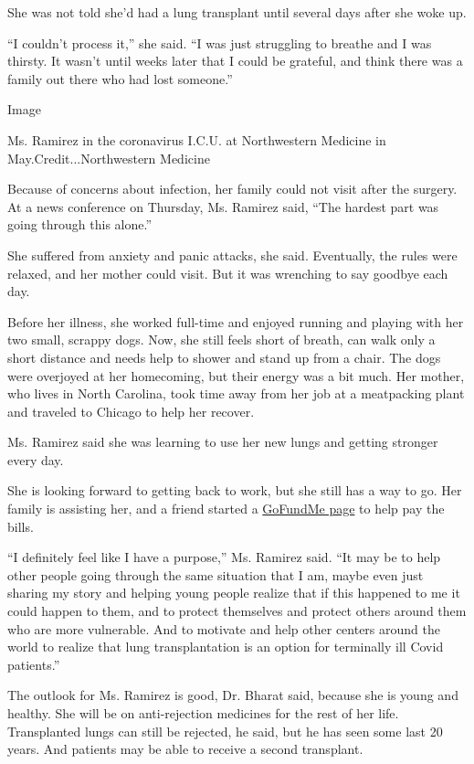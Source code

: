 She was not told she'd had a lung transplant until several days after
she woke up.

``I couldn't process it,'' she said. ``I was just struggling to breathe
and I was thirsty. It wasn't until weeks later that I could be grateful,
and think there was a family out there who had lost someone.''

Image

Ms. Ramirez in the coronavirus I.C.U. at Northwestern Medicine in
May.Credit...Northwestern Medicine

Because of concerns about infection, her family could not visit after
the surgery. At a news conference on Thursday, Ms. Ramirez said, ``The
hardest part was going through this alone.''

She suffered from anxiety and panic attacks, she said. Eventually, the
rules were relaxed, and her mother could visit. But it was wrenching to
say goodbye each day.

Before her illness, she worked full-time and enjoyed running and playing
with her two small, scrappy dogs. Now, she still feels short of breath,
can walk only a short distance and needs help to shower and stand up
from a chair. The dogs were overjoyed at her homecoming, but their
energy was a bit much. Her mother, who lives in North Carolina, took
time away from her job at a meatpacking plant and traveled to Chicago to
help her recover.

Ms. Ramirez said she was learning to use her new lungs and getting
stronger every day.

She is looking forward to getting back to work, but she still has a way
to go. Her family is assisting her, and a friend started a
\href{https://www.gofundme.com/f/covid19-lung-transplant?utm_source=customer\&utm_campaign=p_cp+share-sheet\&utm_medium=copy_link-tip}{GoFundMe
page} to help pay the bills.

``I definitely feel like I have a purpose,'' Ms. Ramirez said. ``It may
be to help other people going through the same situation that I am,
maybe even just sharing my story and helping young people realize that
if this happened to me it could happen to them, and to protect
themselves and protect others around them who are more vulnerable. And
to motivate and help other centers around the world to realize that lung
transplantation is an option for terminally ill Covid patients.''

The outlook for Ms. Ramirez is good, Dr. Bharat said, because she is
young and healthy. She will be on anti-rejection medicines for the rest
of her life. Transplanted lungs can still be rejected, he said, but he
has seen some last 20 years. And patients may be able to receive a
second transplant.

